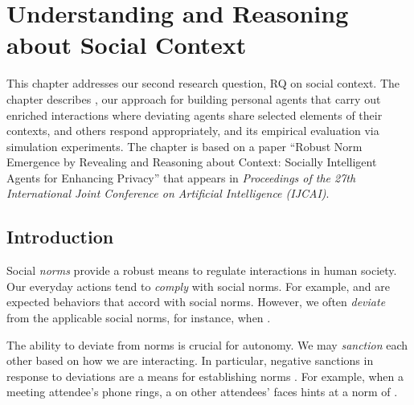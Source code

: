 \chapter[Understanding Social Context]{Understanding and Reasoning about Social Context}
\label{chap:poros}

This chapter addresses our second research question, RQ on social context. The chapter describes \frameworkB, our approach for building
personal agents that carry out enriched interactions where deviating
agents share selected elements of their contexts, and others
respond appropriately, and its empirical evaluation via 
simulation experiments. The chapter is based on a paper ``Robust Norm 
Emergence by Revealing and Reasoning about Context: Socially 
Intelligent Agents for Enhancing Privacy'' that appears in 
\emph{ Proceedings of the 27th International Joint Conference 
on Artificial Intelligence (IJCAI)}.

\section{Introduction}
\label{sec:Poros-intro}

Social \emph{norms} provide a robust means to regulate interactions in 
human society. Our everyday actions tend to \emph{comply} with social norms. For example,  and  are expected 
behaviors that accord with social norms. However,  we often \emph{deviate} from the applicable social norms, for 
instance, when .

The ability to deviate from norms is crucial for autonomy. We 
may \emph{sanction} each other based on how we
are interacting. In particular, negative sanctions in response to
deviations are a means for establishing norms \citep{Andrighetto-2013-PunishVoice}. 
For example, when a meeting attendee's phone rings, a  on other attendees'
faces hints at a norm of .

